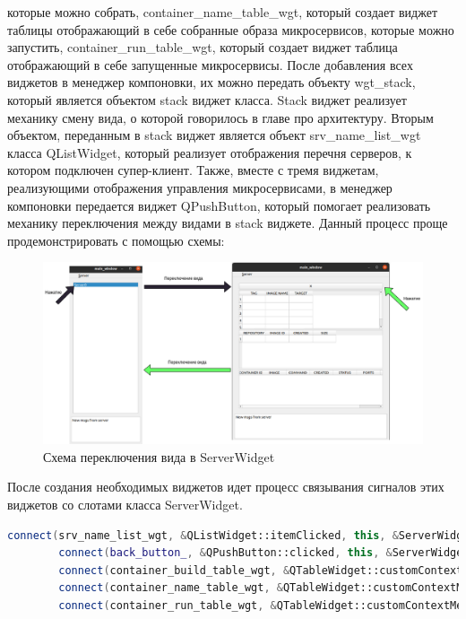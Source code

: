 \documentclass[a4paper, 14pt]{extreport}
\begin{document}
которые можно собрать, container\_name\_table\_wgt, который создает виджет таблицы отображающий в себе собранные образа микросервисов, 
которые можно запустить, container\_run\_table\_wgt, который создает виджет таблица отображающий в себе запущенные микросервисы.
После добавления всех виджетов в менеджер компоновки, их можно передать объекту wgt\_stack, который является объектом stack виджет класса.
Stack виджет реализует механику смену вида, о которой говорилось в главе про архитектуру. Вторым объектом, переданным в stack виджет 
является объект srv\_name\_list\_wgt класса QListWidget, который реализует отображения перечня серверов, к котором подключен супер-клиент.
Также, вместе с тремя виджетам, реализующими отображения управления микросервисами, в менеджер компоновки передается виджет QPushButton, 
который помогает реализовать механику переключения между видами в stack виджете. Данный процесс проще продемонстрировать с помощью схемы:
\begin{figure}[ht]
\begin{center}
\includegraphics[scale = 0.4]{./figure/gui-stack-wgt}
\caption{Схема переключения вида в ServerWidget}
\label{fig:manip_photo}
\end{center}
\end{figure}
\par После создания необходимых виджетов идет процесс связывания сигналов этих виджетов со слотами класса ServerWidget.
\begin{lstlisting}[language=C++, frame=single, xleftmargin=15pt, caption={Cвязывания сигналов и слотов в ServerWidget},label=DescriptiveLabel]
        connect(srv_name_list_wgt, &QListWidget::itemClicked, this, &ServerWidget::onServerClicked);
        connect(back_button_, &QPushButton::clicked, this, &ServerWidget::onServerBackClicked);
        connect(container_build_table_wgt, &QTableWidget::customContextMenuRequested, this, &ServerWidget::showContextBuild);
        connect(container_name_table_wgt, &QTableWidget::customContextMenuRequested, this, &ServerWidget::showContextName);
        connect(container_run_table_wgt, &QTableWidget::customContextMenuRequested, this, &ServerWidget::showContextRun);
\end{lstlisting}
\end{document}

